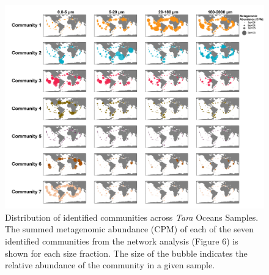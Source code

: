 \documentclass[12pt]{article}
\numberwithin{equation}{section}
\begin{document}
\begin{figure}
    \centering
    \includegraphics[width=0.95\columnwidth]{si-figures/Network_community_maps-01.png}
    \caption{Distribution of identified communities across \textit{Tara} Oceans Samples. The summed metagenomic abundance (CPM) of each of the seven identified communities from the network analysis (Figure 6) is shown for each size fraction. The size of the bubble indicates the relative abundance of the community in a given sample. }
    \label{fig:network-map}
\end{figure}
\end{document}
